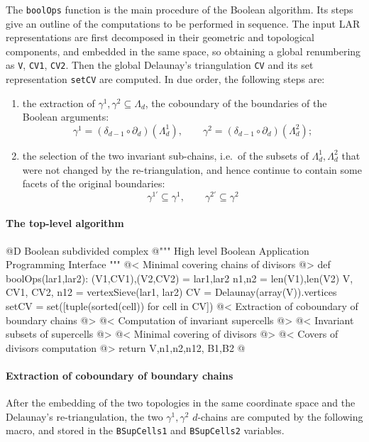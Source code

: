 \documentclass[11pt,oneside]{article}	%
\begin{document}
The \texttt{boolOps} function is the main procedure of the Boolean algorithm.
Its steps give an outline of the computations to be performed in sequence. The input LAR representations are first decomposed in their geometric and topological components, and embedded in the same space, so obtaining a global renumbering as \texttt{V}, \texttt{CV1}, \texttt{CV2}. Then the global Delaunay's triangulation \texttt{CV} and its set representation \texttt{setCV} are computed. In due order, the following steps are:  
\begin{enumerate}
\item 
the extraction of $\gamma^1,\gamma^2\subseteq\Lambda_d$, the coboundary of the boundaries of the Boolean arguments:
\[
\gamma^1 = (\delta_{d-1}\circ\partial_d) (\Lambda_d^1), \qquad
\gamma^2 = (\delta_{d-1}\circ\partial_d) (\Lambda_d^2);
\]  
\item 
the selection of the two invariant sub-chains, i.e.~of the subsets of $\Lambda_d^1, \Lambda_d^2$ that were not changed by the re-triangulation, and hence continue to contain some facets of the original boundaries:
\[
\gamma^{1'} \subseteq \gamma^1, \qquad
\gamma^{2'} \subseteq \gamma^2
\]
\end{enumerate}

\paragraph{The top-level algorithm}

@D Boolean subdivided complex
@{""" High level Boolean Application Programming Interface """
@< Minimal covering chains of divisors @>
def boolOps(lar1,lar2):
	(V1,CV1),(V2,CV2) = lar1,lar2
	n1,n2 = len(V1),len(V2)
	V, CV1, CV2, n12 = vertexSieve(lar1, lar2)
	CV = Delaunay(array(V)).vertices
	setCV = set([tuple(sorted(cell)) for cell in CV])
	@< Extraction of coboundary of boundary chains @>
	@< Computation of invariant supercells @>
	@< Invariant subsets of supercells @>
	@< Minimal covering of divisors @>
	@< Covers of divisors computation @>
	return V,n1,n2,n12, B1,B2
@}

\paragraph{Extraction of coboundary of boundary chains}

After the embedding of the two topologies in the same coordinate space and the Delaunay's re-triangulation, the two $\gamma^1,\gamma^2$ $d$-chains are computed by the following macro, and stored in the \texttt{BSupCells1} and \texttt{BSupCells2} variables.
\end{document}
